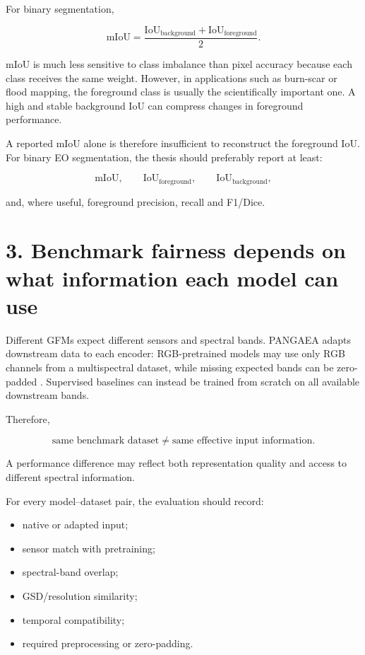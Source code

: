 \documentclass[11pt,a4paper]{article}
\begin{document}
For binary segmentation,

\[
\mathrm{mIoU}=
\frac{\mathrm{IoU}_{\mathrm{background}}+\mathrm{IoU}_{\mathrm{foreground}}}{2}.
\]

mIoU is much less sensitive to class imbalance than pixel accuracy because each class receives the
same weight. However, in applications such as burn-scar or flood mapping, the foreground class is
usually the scientifically important one. A high and stable background IoU can compress changes in
foreground performance.

A reported mIoU alone is therefore insufficient to reconstruct the foreground IoU. For binary EO
segmentation, the thesis should preferably report at least:

\[
\mathrm{mIoU},\qquad
\mathrm{IoU}_{\mathrm{foreground}},\qquad
\mathrm{IoU}_{\mathrm{background}},
\]

and, where useful, foreground precision, recall and F1/Dice.

\section{3. Benchmark fairness depends on what information each model can use}

Different GFMs expect different sensors and spectral bands. PANGAEA adapts downstream data to each
encoder: RGB-pretrained models may use only RGB channels from a multispectral dataset, while missing
expected bands can be zero-padded \cite{pangaea}. Supervised baselines can instead be trained from
scratch on all available downstream bands.

Therefore,

\[
\text{same benchmark dataset} \neq \text{same effective input information}.
\]

A performance difference may reflect both representation quality and access to different spectral
information.

For every model--dataset pair, the evaluation should record:

\begin{itemize}
    \item native or adapted input;
    \item sensor match with pretraining;
    \item spectral-band overlap;
    \item GSD/resolution similarity;
    \item temporal compatibility;
    \item required preprocessing or zero-padding.
\end{itemize}
\end{document}
